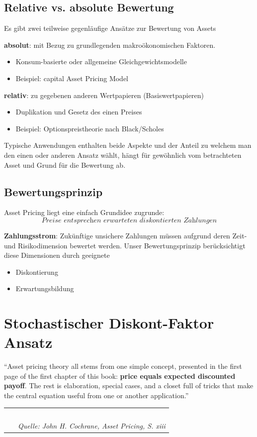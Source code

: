 \documentclass[12pt]{extreport} %
\theoremstyle{named}
\theoremstyle{nnamed}
\theoremstyle{itshape}
\theoremstyle{normal}
\begin{document}
\section{Relative vs. absolute Bewertung}
Es gibt zwei teilweise gegenläufige Ansätze zur Bewertung von Assets
\begin{description}
	\item \textbf{absolut}: mit Bezug zu grundlegenden makroökonomischen Faktoren.
		\begin{itemize}
			\item Konsum-basierte oder allgemeine Gleichgewichtsmodelle
			\item Beispiel: capital Asset Pricing Model
		\end{itemize}
	\item \textbf{relativ}: zu gegebenen anderen Wertpapieren (Basiswertpapieren)
		\begin{itemize}
			\item Duplikation und Gesetz des einen Preises
			\item Beispiel: Optionspreistheorie nach Black/Scholes
		\end{itemize}
\end{description}
Typische Anwendungen enthalten beide Aspekte und der Anteil zu welchem man den einen oder anderen Ansatz  wählt, hängt für gewöhnlich vom betrachteten Asset und Grund für die Bewertung ab.

\section{Bewertungsprinzip}
Asset Pricing liegt eine einfach Grundidee zugrunde:
$$ \textit{Preise entsprechen erwarteten diskontierten Zahlungen} $$ 

\textbf{Zahlungsstrom}: Zukünftige unsichere Zahlungen müssen aufgrund deren Zeit- und Risikodimension bewertet werden. Unser Bewertungsprinzip berücksichtigt diese Dimensionen durch geeignete
\begin{itemize}
	\item Diskontierung
	\item Erwartungsbildung
\end{itemize}

\chapter{Stochastischer Diskont-Faktor Ansatz}

\enquote{Asset pricing theory all stems from one simple concept, presented in the first page of the first chapter of this book: \textbf{price equals expected discounted payoff}. The rest is elaboration, special cases, and a closet full of tricks that make the central equation useful from one or another application.} ~\\ 
	\begin{tabular}{lr} ~\\
  		\hspace{6.35cm} & \textit{Quelle: John H. Cochrane, Asset Pricing, S. xiii}
	\end{tabular} ~\\ ~\bigskip
\end{document}
